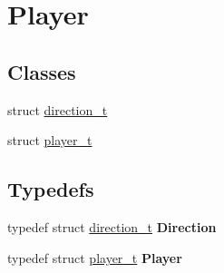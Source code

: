 \hypertarget{group__Player}{}\section{Player}
\label{group__Player}
\subsection*{Classes}
\begin{DoxyCompactItemize}
\item 
struct \hyperlink{structdirection__t}{direction\+\_\+t}
\item 
struct \hyperlink{structplayer__t}{player\+\_\+t}
\end{DoxyCompactItemize}
\subsection*{Typedefs}
\begin{DoxyCompactItemize}
\item 
\mbox{\label{group__Player_gaad7bf7c6939293ab41c6adf85d710960}} 
typedef struct \hyperlink{structdirection__t}{direction\+\_\+t} {\bfseries Direction}
\item 
\mbox{\label{group__Player_ga772cf5c64b40acbe1036970bed167ab1}} 
typedef struct \hyperlink{structplayer__t}{player\+\_\+t} {\bfseries Player}
\end{DoxyCompactItemize}
